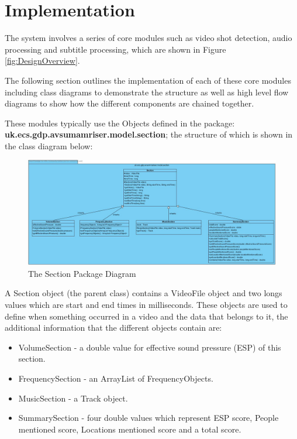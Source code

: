 \section{Implementation}

The system involves a series of core modules such as video shot detection, audio
processing and subtitle processing, which are shown in Figure \ref{fig:DesignOverview}.

The following section outlines the implementation of each of these core modules including class diagrams to demonstrate the structure as well 
as high level flow diagrams to show how the different components are chained together.

These modules typically use the Objects defined in the package: \newline \textbf{uk.ecs.gdp.avsumamriser.model.section}; the structure of which is shown in the class diagram below:

\begin{figure}[h1]
\begin{center}
 \includegraphics[trim = 0mm 0mm 0mm 0mm, clip,
 scale=0.28]{Images/section_package.jpg}
  \caption{The Section Package Diagram}\label{fig:sectionDiagram}
 \end{center}
\end{figure}

A Section object (the parent class) contains a VideoFile object and two longs values which are start and end times in milliseconds. These 
objects are used to define when something occurred in a video and the data that belongs to it, the additional information that the different 
objects contain are:

\begin{itemize}
	\item{VolumeSection - a double value for effective sound pressure (ESP) of this section.}
	\item{FrequencySection - an ArrayList of FrequencyObjects.}
	\item{MusicSection -  a Track object.}
	\item{SummarySection - four double values which represent ESP score, People mentioned score, Locations mentioned score and a total score.}
\end{itemize}

